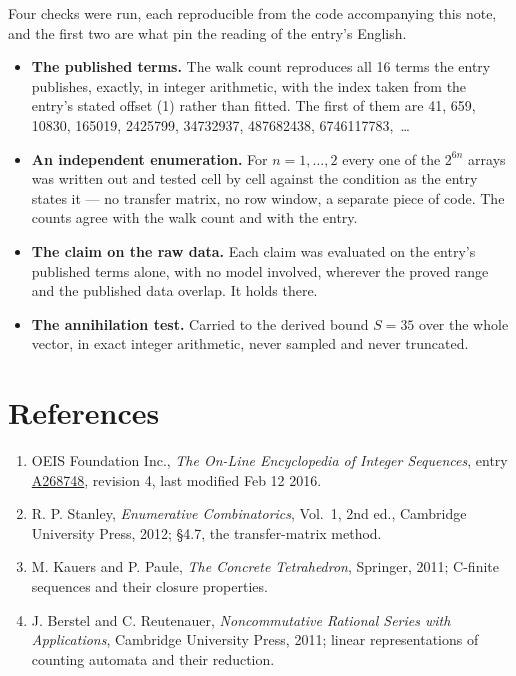 \documentclass[11pt]{article}
\theoremstyle{definition}
\begin{document}
Four checks were run, each reproducible from the code accompanying this note, and the first two are what pin the reading of the entry's English.

\begin{itemize}

\item {\bfseries The published terms.} The walk count reproduces all 16 terms the entry publishes, exactly, in integer arithmetic, with the index taken from the entry's stated offset (1) rather than fitted. The first of them are 41, 659, 10830, 165019, 2425799, 34732937, 487682438, 6746117783,~\dots

\item {\bfseries An independent enumeration.} For $n = 1,\dots,2$ every one of the $2^{6n}$ arrays was written out and tested cell by cell against the condition as the entry states it --- no transfer matrix, no row window, a separate piece of code. The counts agree with the walk count and with the entry.

\item {\bfseries The claim on the raw data.} Each claim was evaluated on the entry's published terms alone, with no model involved, wherever the proved range and the published data overlap. It holds there.

\item {\bfseries The annihilation test.} Carried to the derived bound $S = 35$ over the whole vector, in exact integer arithmetic, never sampled and never truncated.

\end{itemize}

\section{References}

\begin{enumerate}

\item OEIS Foundation Inc., \emph{The On-Line Encyclopedia of Integer Sequences}, entry \href{https://oeis.org/A268748}{A268748}, revision 4, last modified Feb 12 2016.

\item R. P. Stanley, \emph{Enumerative Combinatorics}, Vol.~1, 2nd ed., Cambridge University Press, 2012; \S4.7, the transfer-matrix method.

\item M. Kauers and P. Paule, \emph{The Concrete Tetrahedron}, Springer, 2011; C-finite sequences and their closure properties.

\item J. Berstel and C. Reutenauer, \emph{Noncommutative Rational Series with Applications}, Cambridge University Press, 2011; linear representations of counting automata and their reduction.

\end{enumerate}
\end{document}
